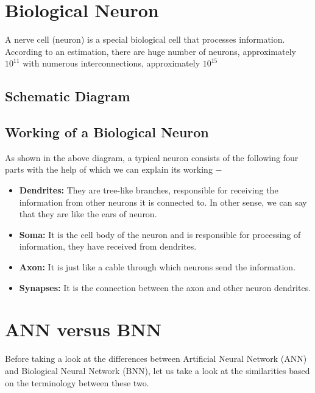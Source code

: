 \documentclass{report}
\begin{document}
\section{Biological Neuron}
A nerve cell (neuron) is a special biological cell that processes information. According to an estimation, there are huge number of neurons, approximately $10^{11}$ with numerous interconnections, approximately $10^{15}$
\subsection{Schematic Diagram}


\subsection{Working of a Biological Neuron}

As shown in the above diagram, a typical neuron consists of the following four parts with the help of which we can explain its working −

\begin{itemize}
\item \textbf{Dendrites: } They are tree-like branches, responsible for receiving the information from other neurons it is connected to. In other sense, we can say that they are like the ears of neuron.

\item \textbf{Soma: } It is the cell body of the neuron and is responsible for processing of information, they have received from dendrites.

\item \textbf{Axon: } It is just like a cable through which neurons send the information.

\item \textbf{Synapses: } It is the connection between the axon and other neuron dendrites.

\end{itemize}

\section{ANN versus BNN}
Before taking a look at the differences between Artificial Neural Network (ANN) and Biological Neural Network (BNN), let us take a look at the similarities based on the terminology between these two.
\end{document}
